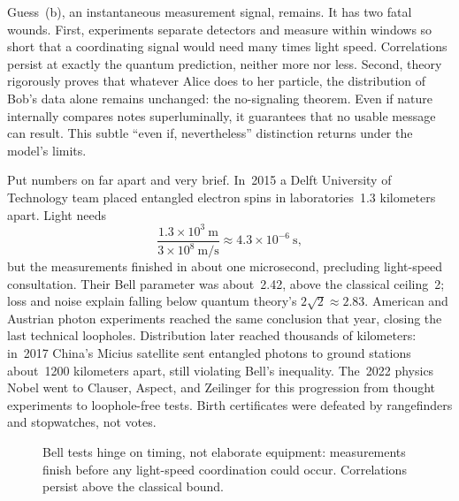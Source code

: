 Guess~(b), an instantaneous measurement signal, remains. It has two fatal wounds. First, experiments separate detectors and measure within windows so short that a coordinating signal would need many times light speed. Correlations persist at exactly the quantum prediction, neither more nor less. Second, theory rigorously proves that whatever Alice does to her particle, the distribution of Bob's data alone remains unchanged: the no-signaling theorem. Even if nature internally compares notes superluminally, it guarantees that no usable message can result. This subtle ``even if, nevertheless'' distinction returns under the model's limits.

Put numbers on far apart and very brief. In~2015 a Delft University of Technology team placed entangled electron spins in laboratories~1.3 kilometers apart. Light needs
\[
\frac{1.3\times10^{3}\ \text{m}}{3\times10^{8}\ \text{m/s}}\approx4.3\times10^{-6}\ \text{s},
\]
but the measurements finished in about one microsecond, precluding light-speed consultation. Their Bell parameter was about~2.42, above the classical ceiling~2; loss and noise explain falling below quantum theory's \(2\sqrt2\approx2.83\). American and Austrian photon experiments reached the same conclusion that year, closing the last technical loopholes. Distribution later reached thousands of kilometers: in~2017 China's Micius satellite sent entangled photons to ground stations about~1200 kilometers apart, still violating Bell's inequality. The~2022 physics Nobel went to Clauser, Aspect, and Zeilinger for this progression from thought experiments to loophole-free tests. Birth certificates were defeated by rangefinders and stopwatches, not votes.

\begin{figure}[htbp]
\centering
{}
\caption{Bell tests hinge on timing, not elaborate equipment: measurements finish before any light-speed coordination could occur. Correlations persist above the classical bound.}
\end{figure}

